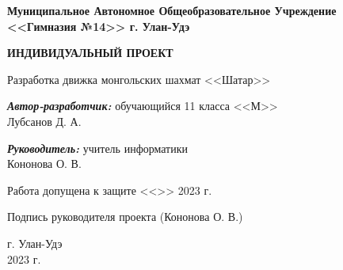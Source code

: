 \begin{titlepage}
	\begin{center}
		\textbf{ 
			Муниципальное Автономное Общеобразовательное Учреждение \\
			<<Гимназия №14>> г. Улан-Удэ
		}
		
		\vspace{4em}
		\textbf{
			ИНДИВИДУАЛЬНЫЙ ПРОЕКТ
		}
		\vspace{4em}

		Разработка движка монгольских шахмат <<Шатар>>

		
	\end{center}
	\vspace{4em}
	\begin{flushright}
		
		\textbf{\textit{Автор-разработчик:}}
		обучающийся 11 класса <<М>> \\
		Лубсанов Д. А.
		
		\vspace{2em}
		
		\textbf{\textit{Руководитель:}}
		учитель информатики \\
		Кононова О. В.
		
	\end{flushright}
	
	\vspace{4em}
	
	Работа допущена к защите <<\underline{\hspace{2em}}>> \underline{\hspace{6em}} 2023 г.
	
	\vspace{1em}
	
	Подпись руководителя проекта \hspace{1em} \hrulefill \hspace{1em}(Кононова О. В.)
	
	\vspace{5em}
	
	\begin{center}
		г. Улан-Удэ \\
		2023 г.
	\end{center}
	
	\clearpage
\end{titlepage}